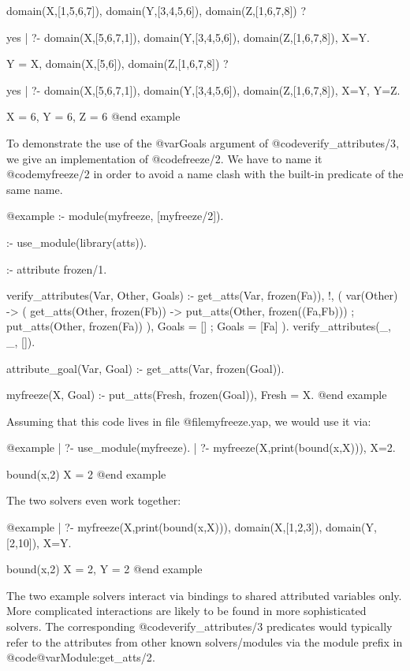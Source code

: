 {{{{{{{{domain(X,[1,5,6,7]),
domain(Y,[3,4,5,6]),
domain(Z,[1,6,7,8]) ? 

yes
| ?- domain(X,[5,6,7,1]), domain(Y,[3,4,5,6]), domain(Z,[1,6,7,8]), 
     X=Y.

Y = X,
domain(X,[5,6]),
domain(Z,[1,6,7,8]) ? 

yes
| ?- domain(X,[5,6,7,1]), domain(Y,[3,4,5,6]), domain(Z,[1,6,7,8]),
     X=Y, Y=Z.

X = 6,
Y = 6,
Z = 6
@end example

To demonstrate the use of the @var{Goals} argument of
@code{verify_attributes/3}, we give an implementation of
@code{freeze/2}.  We have to name it @code{myfreeze/2} in order to
avoid a name clash with the built-in predicate of the same name.

@example
:- module(myfreeze, [myfreeze/2]).

:- use_module(library(atts)).

:- attribute frozen/1.

verify_attributes(Var, Other, Goals) :-
        get_atts(Var, frozen(Fa)), !,       %
        (   var(Other) ->                   %
            (   get_atts(Other, frozen(Fb)) %
            ->  put_atts(Other, frozen((Fa,Fb))) %
            ;   put_atts(Other, frozen(Fa)) %
            ),
            Goals = []
        ;   Goals = [Fa]
        ).
verify_attributes(_, _, []).

attribute_goal(Var, Goal) :-                %
        get_atts(Var, frozen(Goal)).

myfreeze(X, Goal) :-
        put_atts(Fresh, frozen(Goal)),
        Fresh = X.
@end example

Assuming that this code lives in file @file{myfreeze.yap},
we would use it via:

@example
| ?- use_module(myfreeze).
| ?- myfreeze(X,print(bound(x,X))), X=2.

bound(x,2)                      %
X = 2                           %
@end example

The two solvers even work together:

@example
| ?- myfreeze(X,print(bound(x,X))), domain(X,[1,2,3]),
     domain(Y,[2,10]), X=Y.

bound(x,2)                      %
X = 2,                          %
Y = 2
@end example

The two example solvers interact via bindings to shared attributed
variables only.  More complicated interactions are likely to be found
in more sophisticated solvers.  The corresponding
@code{verify_attributes/3} predicates would typically refer to the
attributes from other known solvers/modules via the module prefix in
@code{@var{Module}:get_atts/2}.

}}}}}}}}

